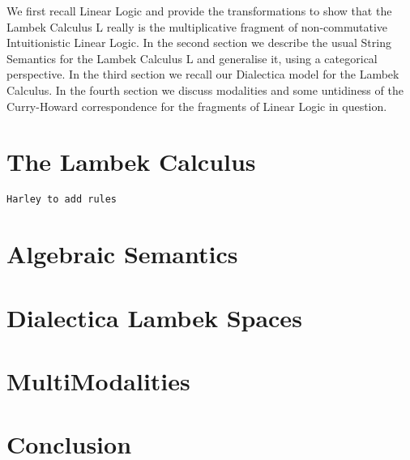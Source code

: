 \documentclass{article}
\begin{document}
We first recall Linear Logic and provide the transformations to show that the Lambek Calculus \textsf{L} really is the multiplicative fragment of non-commutative Intuitionistic Linear Logic. 
In the second section we describe the usual String Semantics for the Lambek Calculus \textsf{L} and generalise it, using a categorical perspective. 
In the third section we recall our Dialectica model for the Lambek Calculus. 
In the fourth section we discuss modalities and some untidiness of the Curry-Howard correspondence for the fragments of Linear Logic in question.



\section{The Lambek Calculus}
\texttt{Harley to add rules}

\section{Algebraic Semantics}

\section{Dialectica Lambek Spaces}

\section{MultiModalities}
\section{Conclusion}




\end{document}
